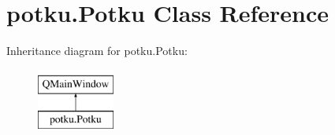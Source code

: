\hypertarget{classpotku_1_1Potku}{\section{potku.\-Potku Class Reference}
\label{classpotku_1_1Potku}
}
Inheritance diagram for potku.\-Potku\-:\begin{figure}[H]
\begin{center}
\leavevmode
\includegraphics[height=2.000000cm]{classpotku_1_1Potku}
\end{center}
\end{figure}
